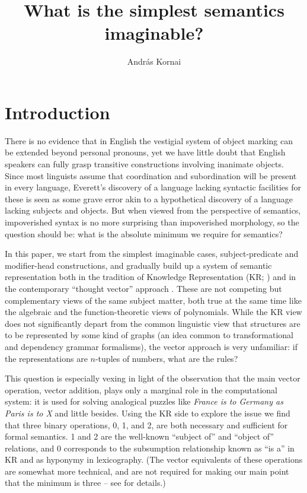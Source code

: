 \documentclass[output=paper,colorlinks=true,citecolor=brown]{langscibook}
\author{András Kornai\orcid{0000-0001-6078-6840}\affiliation{Budapest University of Technology and Economics}}
\title{What is the simplest semantics imaginable?}
\begin{document}
\maketitle

\section{Introduction}

There is no evidence that in English the vestigial system of object marking can
be extended beyond personal pronouns, yet we have little doubt that English
speakers can fully grasp transitive constructions involving inanimate
objects. Since most linguists assume that coordination and subordination will
be present in every language, Everett's discovery of a language lacking
syntactic facilities for these is seen as some grave error akin to a
hypothetical discovery of a language lacking subjects and objects. But when
viewed from the perspective of semantics, impoverished syntax is no more
surprising than impoverished morphology, so the question should be: what is
the absolute minimum we require for semantics?

In this paper, we start from the simplest imaginable cases, subject-predicate
and modifier-head constructions, and gradually build up a system of semantic
representation both in the tradition of Knowledge Representation (KR; 
\cite{Brachman:2004}) and in the contemporary ``thought vector'' approach
\citep{LeCun:2015,Kornai:2022}. These are not competing but complementary
views of the same subject matter, both true at the same time like the
algebraic and the function-theoretic views of polynomials. While the KR view
does not significantly depart from the common linguistic view that
structures are to be represented by some kind of graphs (an idea common to
transformational and dependency grammar formalisms), the vector approach is
very unfamiliar: if the representations are $n$-tuples of numbers, what are
the rules?

This question is especially vexing in light of the observation that the main
vector operation, vector addition, plays only a marginal role in the
computational system: it is used for solving analogical puzzles like \textit{France is to Germany as Paris is to X} \citep{Mikolov:2013l} and little
besides. Using the KR side to explore the issue we find that three binary
operations, 0, 1, and 2, are both necessary and sufficient for formal
semantics. 1 and 2 are the well-known ``subject of'' and ``object of''
relations, and 0 corresponds to the subsumption relationship known as ``is a''
in KR and as hyponymy in lexicography. (The vector equivalents of these
operations are somewhat more technical, and are not required for making our
main point that the minimum is three -- see \citet{Kornai:2022} for details.)
\end{document}
